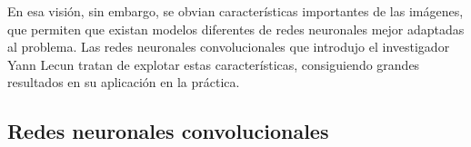 En esa visión, sin embargo, se obvian características importantes de las imágenes, que permiten que existan modelos diferentes de redes neuronales mejor adaptadas al problema. Las redes neuronales convolucionales que introdujo el investigador Yann Lecun \cite{lecun-89e}\cite{lecun-98} tratan de explotar estas características, consiguiendo grandes resultados en su aplicación en la práctica.\\ 

\subsection{Redes neuronales convolucionales}


